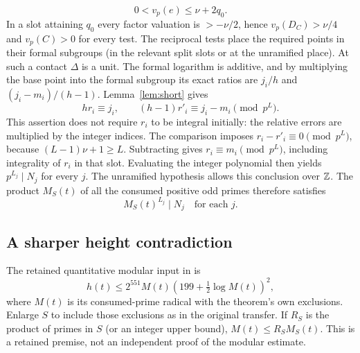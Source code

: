 \documentclass[11pt]{article}
\begin{document}
\[
 0<v_p(e)\le \nu+2q_0.
\]
In a slot attaining $q_0$ every factor valuation is $>-\nu/2$, hence
$v_p(D_C)>\nu/4$ and $v_p(C)>0$ for every test. The reciprocal tests
place the required points in their formal subgroups (in the relevant
split slots or at the unramified place). At such a contact $\Delta$
is a unit. The formal logarithm is additive, and by multiplying the
base point into the formal subgroup its exact ratios are $j_i/h$ and
$(j_i-m_i)/(h-1)$. Lemma~\ref{lem:short} gives
\[
 h r_i\equiv j_i,\qquad (h-1)r'_i\equiv j_i-m_i\pmod {p^L}.
\]
This assertion does not require $r_i$ to be integral initially: the
relative errors are multiplied by the integer indices. The comparison
imposes $r_i-r'_i\equiv0\pmod {p^L}$, because $(L-1)\nu+1\ge L$.
Subtracting gives $r_i\equiv m_i\pmod {p^L}$, including integrality
of $r_i$ in that slot. Evaluating the integer polynomial then yields
$p^{L_j}\mid N_j$ for every $j$. The unramified hypothesis allows
this conclusion over $\mathbb Z$. The product $M_S(t)$ of all the consumed
positive odd primes therefore satisfies
\begin{equation}\label{eq:raddiv}
 M_S(t)^{L_j}\mid N_j\quad\text{for each }j.
\end{equation}

\subsection{A sharper height contradiction}
The retained quantitative modular input in \cite{index} is
\begin{equation}\label{eq:modular}
 h(t)\le 2^{551} M(t)(199+\tfrac12\log M(t))^2,
\end{equation}
where $M(t)$ is its consumed-prime radical with the theorem's own
exclusions. Enlarge $S$ to include those exclusions as in the original
transfer. If $R_S$ is the product of primes in $S$ (or an integer upper
bound), $M(t)\le R_S M_S(t)$. This is a retained premise, not an
independent proof of the modular estimate.
\end{document}
